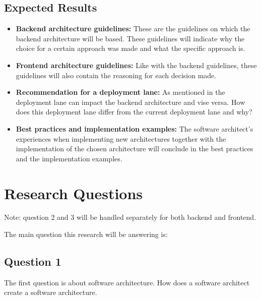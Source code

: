 \subsection{Expected Results}
\label{sec:ExpectedResults}

\begin{itemize}
	\item \textbf{Backend architecture guidelines: } These are the guidelines on which the backend architecture will be based. These guidelines will indicate why the choice for a certain approach was made and what the specific approach is.

	\item \textbf{Frontend architecture guidelines: } Like with the backend guidelines, these guidelines will also contain the reasoning for each decision made.

	\item \textbf{Recommendation for a deployment lane: } As mentioned in  the deployment lane can impact the backend architecture and vise versa. How does this deployment lane differ from the current deployment lane and why?

	\item \textbf{Best practices and implementation examples: } The software architect's experiences when implementing new architectures together with the implementation of the chosen architecture will conclude in the best practices and the implementation examples.
\end{itemize}

\section{Research Questions}
Note: question 2 and 3 will be handled separately for both backend and frontend.

The main question this research will be answering is:


\subsection{Question 1}
\label{sec:Question1}
The first question is about software architecture. How does a software architect create a software architecture.

